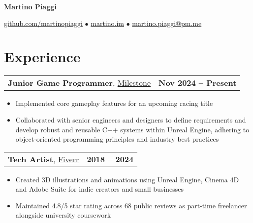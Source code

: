 \documentclass[10pt, letterpaper]{article}
\newenvironment{highlights}{
    \begin{itemize}[topsep=0cm, parsep=0.05cm, itemsep=0.05cm, leftmargin=1.0cm]
}{
    \end{itemize}
}
\begin{document}
\begin{center}
    \fontsize{26pt}{26pt}\selectfont\textbf{Martino Piaggi}

    \vspace{0.3cm}
    \normalsize
    \href{https://github.com/martinopiaggi}{github.com/martinopiaggi} $\bullet$
    \href{https://martino.im}{martino.im} $\bullet$ 
    \href{mailto:martino.piaggi@pm.me}{martino.piaggi@pm.me}  
\end{center}

\vspace{0.2cm}

\section{Experience}

\begin{tabularx}{\textwidth}{@{}Xr@{}}
    \textbf{Junior Game Programmer}, \href{https://games.milestone.it/}{Milestone} & \textbf{Nov 2024 – Present}
\end{tabularx}

\begin{highlights}
\item Implemented core gameplay features for an upcoming racing title 
\item Collaborated with senior engineers and designers to define requirements and develop robust and reusable C++ systems within Unreal Engine, adhering to object-oriented programming principles and industry best practices
\end{highlights}

\vspace{0.2cm}

\begin{tabularx}{\textwidth}{@{}Xr@{}}
    \textbf{Tech Artist}, \href{https://www.fiverr.com/sbdsurface}{Fiverr}  & \textbf{2018 – 2024}
\end{tabularx}

\begin{highlights}
    \item Created 3D illustrations and animations using Unreal Engine, Cinema 4D and Adobe Suite for indie creators and small businesses 
    \item Maintained 4.8/5 star rating across 68 public reviews as part-time freelancer alongside university coursework
\end{highlights}

\vspace{0.2cm}
\end{document}
